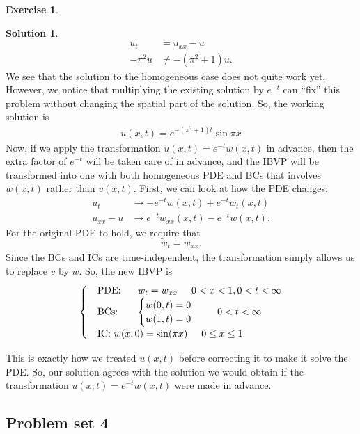\documentclass{article}
\theoremstyle{definition}
\newtheorem*{exer*}{Exercise}
\newtheorem*{sln*}{Solution}
\begin{document}
\begin{exer*}
\begin{sln*}
		\begin{align*}
		u_t &= u_{xx} - u\\
		-\pi^2 u &\neq -(\pi^2 + 1)u.
		\end{align*} 
		We see that the solution to the homogeneous case does not quite work yet. However, we notice that multiplying the existing solution by $e^{-t}$ can ``fix'' this problem without changing the spatial part of the solution. So, the working solution is
		\begin{align*}
		\boxed{u(x,t) = e^{-(\pi^2 +1 )t}\sin\pi x}
		\end{align*} 
		Now, if we apply the transformation $u(x,t) = e^{-t}w(x,t)$ in advance, then the extra factor of $e^{-t}$ will be taken care of in advance, and the IBVP will be transformed into one with both homogeneous PDE and BCs that involves $w(x,t)$ rather than $v(x,t)$. First, we can look at how the PDE changes:
		\begin{align*}
		u_t &\to -e^{-t}w(x,t) + e^{-t}w_t(x,t)\\
		u_{xx} - u &\to e^{-t}w_{xx}(x,t) - e^{-t}w(x,t).
		\end{align*}
		For the original PDE to hold, we require that
		\begin{align*}
		w_t = w_{xx}.
		\end{align*}
		Since the BCs and ICs are time-independent, the transformation simply allows us to replace $v$ by $w$. So, the new IBVP is
		\begin{align*}
		\begin{cases}
		&\text{PDE: }\hspace{0.5cm} w_t = w_{xx}\hspace{0.5cm} 0<x<1, 0 < t < \infty\\
		&\text{BCs: }\hspace{0.5cm} \begin{cases}
		w(0,t) = 0\\
		w(1,t) = 0
		\end{cases}\hspace{0.5cm} 0 < t < \infty\\
		&\text{IC: } w(x,0) = \sin(\pi x) \hspace{0.5cm} 0 \leq x \leq 1.
		\end{cases}
		\end{align*}
		
		This is exactly how we treated $u(x,t)$ before correcting it to make it solve the PDE. So, our solution agrees with the solution we would obtain if the transformation $u(x,t) = e^{-t}w(x,t)$ were made in advance.
		
	\end{sln*}
	
\end{exer*}


\newpage
\subsection{Problem set 4}
\end{document}
